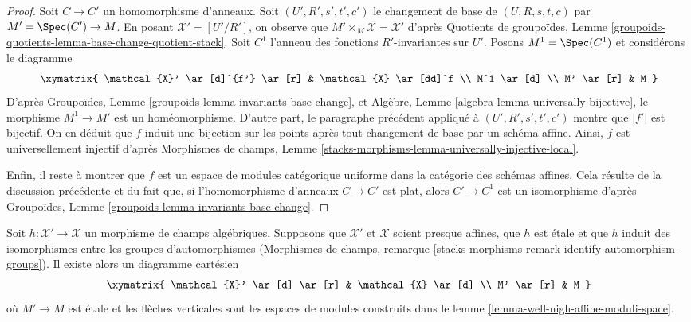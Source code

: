 \begin{proof}
\medskip\noindent
Soit $C \to C'$ un homomorphisme d'anneaux. Soit $(U', R', s', t', c')$
le changement de base de $(U, R, s, t, c)$ par $M' = \Spec(C') \to M$.
En posant $\mathcal{X}' = [U'/R']$, on observe que
$M' \times_M \mathcal{X} = \mathcal{X}'$ d'après
Quotients de groupoïdes, Lemme
\ref{groupoids-quotients-lemma-base-change-quotient-stack}.
Soit $C^1$ l'anneau des fonctions $R'$-invariantes sur $U'$.
Posons $M^1 = \Spec(C^1)$ et considérons le diagramme
$$
\xymatrix{
\mathcal{X}' \ar[d]^{f'} \ar[r] & \mathcal{X} \ar[dd]^f \\
M^1 \ar[d] \\
M' \ar[r] & M
}
$$
D'après Groupoïdes, Lemme \ref{groupoids-lemma-invariants-base-change}, et
Algèbre, Lemme \ref{algebra-lemma-universally-bijective},
le morphisme $M^1 \to M'$ est un homéomorphisme.
D'autre part, le paragraphe précédent appliqué à
$(U', R', s', t', c')$ montre que $|f'|$ est bijectif.
On en déduit que $f$ induit une bijection sur les points après tout
changement de base par un schéma affine. Ainsi, $f$ est universellement injectif
d'après Morphismes de champs, Lemme
\ref{stacks-morphisms-lemma-universally-injective-local}.

\medskip\noindent
Enfin, il reste à montrer que $f$ est un espace de modules catégorique uniforme
dans la catégorie des schémas affines. Cela résulte de la discussion
précédente et du fait que, si
l'homomorphisme d'anneaux $C \to C'$ est plat, alors $C' \to C^1$ est un isomorphisme
d'après Groupoïdes, Lemme \ref{groupoids-lemma-invariants-base-change}.
\end{proof}

\begin{lemma}
\label{lemma-well-nigh-affine-moduli-space-etale}
Soit $h : \mathcal{X}' \to \mathcal{X}$ un morphisme de champs algébriques.
Supposons que $\mathcal{X}'$ et $\mathcal{X}$ soient presque affines,
que $h$ est \'etale et que $h$ induit des isomorphismes entre les groupes d'automorphismes
(Morphismes de champs, remarque
\ref{stacks-morphisms-remark-identify-automorphism-groups}).
Il existe alors un diagramme cartésien
$$
\xymatrix{
\mathcal{X}' \ar[d] \ar[r] & \mathcal{X} \ar[d] \\
M' \ar[r] & M
}
$$
où $M' \to M$ est \'etale et
les flèches verticales sont les espaces de modules construits dans le
lemme \ref{lemma-well-nigh-affine-moduli-space}.
\end{lemma}

